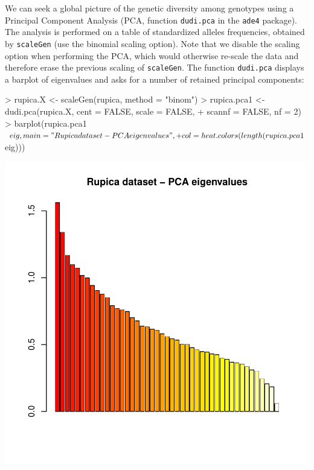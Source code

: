 \documentclass{article}
\begin{document}
We can seek a global picture of the genetic diversity among genotypes
using a Principal Component Analysis (PCA, function \texttt{dudi.pca} in the \texttt{ade4}
package).
The analysis is performed on a table of standardized alleles
frequencies, obtained by \texttt{scaleGen} (use the binomial scaling option).
Note that we disable the scaling option when performing the PCA, which would otherwise re-scale the
data and therefore erase the previous scaling of \texttt{scaleGen}.
The function \texttt{dudi.pca} displays a barplot of
eigenvalues and asks for a number of retained principal components:
\begin{Schunk}
\begin{Sinput}
> rupica.X <- scaleGen(rupica, method = "binom")
> rupica.pca1 <- dudi.pca(rupica.X, cent = FALSE, scale = FALSE, 
+     scannf = FALSE, nf = 2)
> barplot(rupica.pca1$eig, main = "Rupica dataset - PCA eigenvalues", 
+     col = heat.colors(length(rupica.pca1$eig)))
\end{Sinput}
\end{Schunk}
\includegraphics{figs/spca-032}
\end{document}
